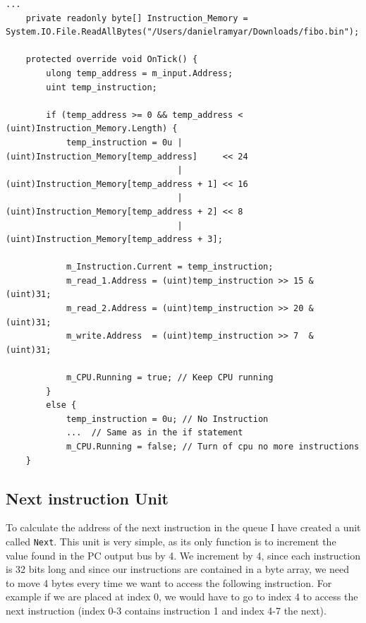         \begin{minipage}{\linewidth}
            \begin{lstlisting}[language={[Sharp]C}, caption={A slice of the Instruction Memory unit SME code. It contains a single byte array, which holds all the instructions to be run. First we check whether the given address to be accessed lies within instruction array, if not we shut down the CPU. We then use the address to access the correct array elements and create a temporary variable, which contains the instruction, as shown in lines 9-12. Hereafter we slice out the fields in the instruction and place the values in the correct busses. Lastly we tell the simulator to keep the CPU running using the CPU bus.},captionpos=b, label = IMSME]
...
    private readonly byte[] Instruction_Memory = System.IO.File.ReadAllBytes("/Users/danielramyar/Downloads/fibo.bin");
            
    protected override void OnTick() {
        ulong temp_address = m_input.Address;
        uint temp_instruction;
            
        if (temp_address >= 0 && temp_address < (uint)Instruction_Memory.Length) {
            temp_instruction = 0u | (uint)Instruction_Memory[temp_address]     << 24
                                  | (uint)Instruction_Memory[temp_address + 1] << 16
                                  | (uint)Instruction_Memory[temp_address + 2] << 8
                                  | (uint)Instruction_Memory[temp_address + 3];
            
            m_Instruction.Current = temp_instruction;
            m_read_1.Address = (uint)temp_instruction >> 15 & (uint)31; 
            m_read_2.Address = (uint)temp_instruction >> 20 & (uint)31; 
            m_write.Address  = (uint)temp_instruction >> 7  & (uint)31; 
            
            m_CPU.Running = true; // Keep CPU running
        }
        else {
            temp_instruction = 0u; // No Instruction
            ...  // Same as in the if statement
            m_CPU.Running = false; // Turn of cpu no more instructions
    }
            \end{lstlisting}
        \end{minipage}  
        
        
        
    
    \subsection{Next instruction Unit}
        To calculate the address of the next instruction in the queue I have created a unit called \texttt{Next}. This unit is very simple, as its only function is to increment the value found in the PC output bus by 4. We increment by 4, since each instruction is 32 bits long and since our instructions are contained in a byte array, we need to move 4 bytes every time we want to access the following instruction. For example if we are placed at index 0, we would have to go to index 4 to access the next instruction (index 0-3 contains instruction 1 and index 4-7 the next).
        
